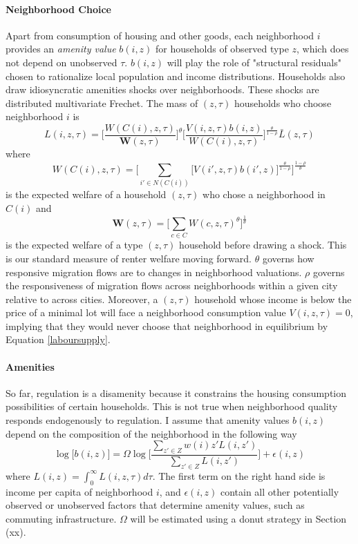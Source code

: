 \documentclass[]{article}
\begin{document}
\paragraph*{Neighborhood Choice} 
Apart from consumption of housing and other goods, each neighborhood $i$ provides an \textit{amenity value} $b(i, z)$ for households of observed type $z$, which does not depend on unobserved $\tau$. $b(i, z)$ will play the role of "structural residuals" chosen to rationalize local population and income distributions. Households also draw idiosyncratic amenities shocks over neighborhoods. These shocks are distributed multivariate Frechet. The mass of $(z, \tau)$ households who choose neighborhood $i$ is 
\begin{equation}\label{laboursupply}
	L(i, z, \tau) = \bigg[\frac{W(C(i), z, \tau)}{\boldsymbol{W}(z, \tau)}\bigg]^{\theta}\bigg[\frac{V(i, z, \tau)b(i, z)}{W(C(i), z, \tau)}\bigg]^{\frac{\theta}{1-\rho}}\bar{L}(z, \tau)
\end{equation}
where
\begin{equation*}
	W(C(i), z, \tau) = \bigg[\sum_{i' \in N(C(i))}\big[V(i', z, \tau)b(i', z)\big]^{\frac{\theta}{1-\rho}}\bigg]^{\frac{1-\rho}{\theta}}
\end{equation*} 
is the expected welfare of a household $(z, \tau)$ who chose a neighborhood in $C(i)$ and 
\begin{equation*}
	\boldsymbol{W}(z, \tau) = \bigg[\sum_{c \in C} W(c, z, \tau)^{\theta}\bigg]^{\frac{1}{\theta}}	
\end{equation*}
is the expected welfare of a type $(z, \tau)$ household before drawing a shock.  This is our standard measure of renter welfare moving forward. $\theta$ governs how responsive migration flows are to changes in neighborhood valuations. $\rho$ governs the responsiveness of migration flows across neighborhoods within a given city relative to across cities. Moreover, a $(z, \tau)$ household whose income is below the price of a minimal lot will face a neighborhood consumption value $V(i, z, \tau) = 0$, implying that they would never choose that neighborhood in equilibrium by Equation \eqref{laboursupply}. 
 
\paragraph*{Amenities} So far, regulation is a disamenity because it constrains the housing consumption possibilities of certain households. This is not true when neighborhood quality responds endogenously to regulation. I assume that amenity values $b(i, z)$ depend on the composition of the neighborhood in the following way 
\begin{equation}\label{endoamen}
	\log\big[b(i, z)\big] = \Omega\log\bigg[\frac{\sum_{z' \in Z}w(i)z'L(i, z')}{\sum_{z' \in Z}L(i, z')}\bigg] + \epsilon(i, z)
\end{equation}
where $L(i, z) = \int^{\infty}_{0}L(i, z, \tau)d\tau$. The first term on the right hand side is income per capita of neighborhood $i$, and $\epsilon(i, z)$ contain all other potentially observed or unobserved factors that determine amenity values, such as commuting infrastructure. $\Omega$ will be estimated using a donut strategy in Section (xx). 
\end{document}
